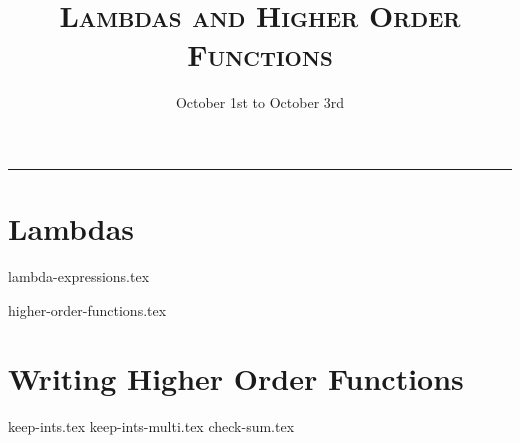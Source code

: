 \documentclass{exam}
\title{\textsc{Lambdas and Higher Order Functions}}
\date{October 1st to October 3rd}
\begin{document}
\maketitle
\rule{\textwidth}{0.15em}
\fontsize{12}{15}\selectfont


\section{Lambdas}
{lambda-expressions.tex}
\newpage
\begin{questions}
{higher-order-functions.tex}
\newpage
\section{Writing Higher Order Functions}
\vspace{-1.5em}
{keep-ints.tex}
{keep-ints-multi.tex}
{check-sum.tex}

\end{questions}
\end{document}
